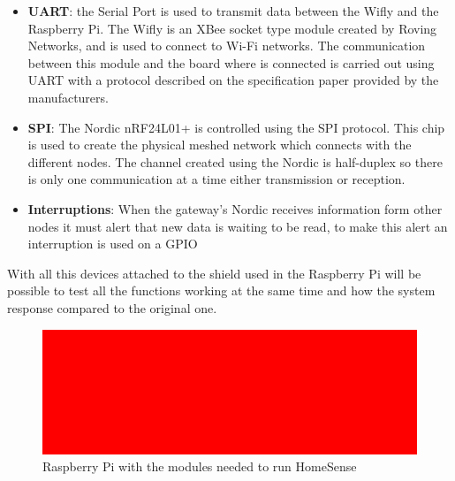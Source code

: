 \begin{itemize}
\item \textbf{UART}: the Serial Port is used to transmit data between the Wifly and the Raspberry Pi. The Wifly is an XBee socket type module created by Roving Networks, and is used to connect to Wi-Fi networks. The communication between this module and the board where is connected is carried out using UART with a protocol described on the specification paper provided by the manufacturers.

\item \textbf{SPI}: The Nordic nRF24L01+ is controlled using the SPI protocol. This chip is used to create the physical meshed network which connects with the different nodes. The channel created using the Nordic is half-duplex so there is only one communication at a time either transmission or reception.
\item \textbf{Interruptions}: When the gateway's Nordic receives information form other nodes it must alert that new data is waiting to be read, to make this alert an interruption is used on a GPIO
\end{itemize}
With all this devices attached to the shield used in the Raspberry Pi will be possible to test all the functions working at the same time and how the system response compared to the original one.
\begin{figure}[H]\begin{center}
 \centering
  \captionsetup{justification=centering}
  \includegraphics[width=1\textwidth]{pictures/sample/red}
  \caption{Raspberry Pi with the modules needed to run HomeSense\label{fig:IOEx-HS-Stack}}
\end{center}\end{figure}


